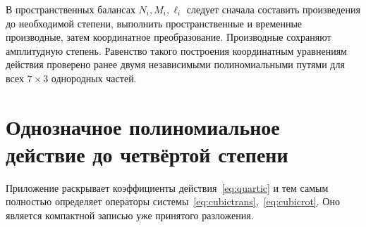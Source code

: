 \documentclass[11pt,a4paper]{article}
\begin{document}
В пространственных балансах $N_i,M_i,\ell_i$ следует сначала составить произведения до необходимой степени, выполнить пространственные и временные производные, затем координатное преобразование. Производные сохраняют амплитудную степень. Равенство такого построения координатным уравнениям действия проверено ранее двумя независимыми полиномиальными путями для всех $7\times3$ однородных частей.

\section{Однозначное полиномиальное действие до четвёртой степени}
Приложение раскрывает коэффициенты действия~\eqref{eq:quartic} и тем самым полностью определяет операторы системы~\eqref{eq:cubictrans},~\eqref{eq:cubicrot}. Оно является компактной записью уже принятого разложения.
\end{document}
